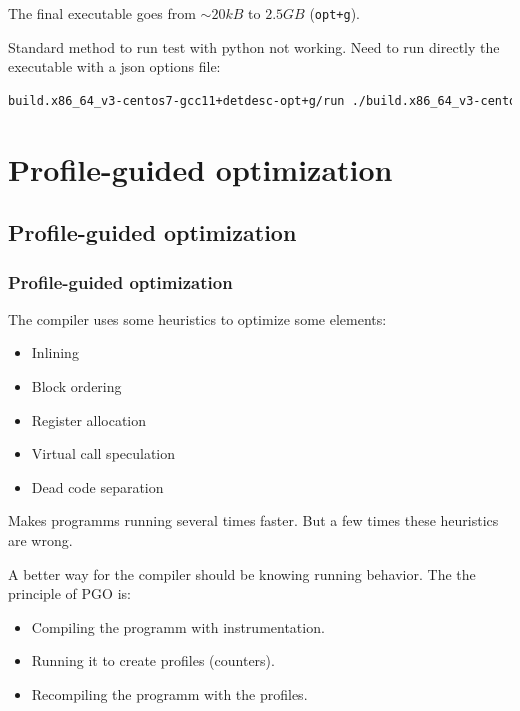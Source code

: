 \documentclass{beamer}
\begin{document}
    \begin{frame}[fragile]
        The final executable goes from $ \sim 20 kB $ to $ 2.5 GB $ (\verb'opt+g').

        Standard method to run test with python not working. Need to run directly the executable with a json options file:
        \begin{lstlisting}[language=bash,basicstyle=\scriptsize,breaklines]
            build.x86_64_v3-centos7-gcc11+detdesc-opt+g/run ./build.x86_64_v3-centos7-gcc11+detdesc-opt+g/Gaudi/Gaudi/Gaudi_static options.json
        \end{lstlisting}
    \end{frame}

\section{Profile-guided optimization}

    \begin{frame}
        \tableofcontents[currentsection]
    \end{frame}

    \subsection{Profile-guided optimization}

    \begin{frame}
        \frametitle{Profile-guided optimization}

        The compiler uses some heuristics to optimize some elements:
        \begin{itemize}
            \item Inlining
            \item Block ordering
            \item Register allocation
            \item Virtual call speculation
            \item Dead code separation
        \end{itemize}
        Makes programms running several times faster.
        But a few times these heuristics are wrong.
    \end{frame}


    \begin{frame}
        A better way for the compiler should be knowing running behavior.
        The the principle of PGO is:
        \begin{itemize}
            \item Compiling the programm with instrumentation.
            \item Running it to create profiles (counters).
            \item Recompiling the programm with the profiles.
        \end{itemize}
    \end{frame}
\end{document}
